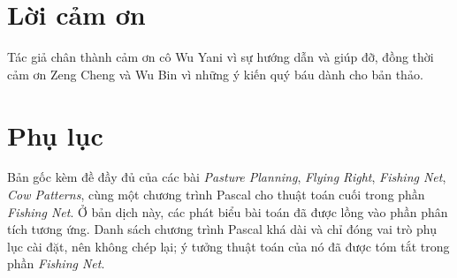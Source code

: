\documentclass[11pt]{article}
\begin{document}
\section*{Lời cảm ơn}

Tác giả chân thành cảm ơn cô Wu Yani vì sự hướng dẫn và giúp đỡ, đồng thời cảm
ơn Zeng Cheng và Wu Bin vì những ý kiến quý báu dành cho bản thảo.

\section*{Phụ lục}

Bản gốc kèm đề đầy đủ của các bài \textit{Pasture Planning},
\textit{Flying Right}, \textit{Fishing Net}, \textit{Cow Patterns}, cùng một
chương trình Pascal cho thuật toán cuối trong phần \textit{Fishing Net}. Ở bản
dịch này, các phát biểu bài toán đã được lồng vào phần phân tích tương ứng.
Danh sách chương trình Pascal khá dài và chỉ đóng vai trò phụ lục cài đặt, nên
không chép lại; ý tưởng thuật toán của nó đã được tóm tắt trong phần
\textit{Fishing Net}.
\end{document}
